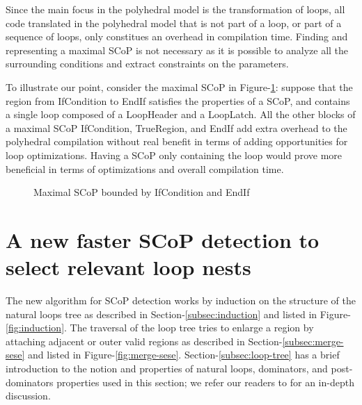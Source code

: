 \documentclass{sigplanconf}
\begin{document}
Since the main focus in the polyhedral model is the transformation of loops, all
code translated in the polyhedral model that is not part of a loop, or part of a
sequence of loops, only constitues an overhead in compilation time.  Finding and
representing a maximal SCoP is not necessary as it is possible to analyze all
the surrounding conditions and extract constraints on the parameters.

To illustrate our point, consider the maximal SCoP in
Figure-\ref{fig:maximality}: suppose that the region from IfCondition to EndIf
satisfies the properties of a SCoP, and contains a single loop composed of a
LoopHeader and a LoopLatch.  All the other blocks of a maximal SCoP
IfCondition, TrueRegion, and EndIf add extra overhead to the polyhedral
compilation without real benefit in terms of adding opportunities for loop
optimizations.  Having a SCoP only containing the loop would prove more
beneficial in terms of optimizations and overall compilation time.

\begin{figure}
\centering
\caption{Maximal SCoP bounded by IfCondition and EndIf}
\label{fig:maximality}
\end{figure}

\section{A new faster SCoP detection to select relevant loop nests}
\label{sec:new-SCoP-detection}
The new algorithm for SCoP detection works by induction on the structure of the
natural loops tree as described in Section-\ref{subsec:induction} and listed in
Figure-\ref{fig:induction}.  The traversal of the loop tree tries to enlarge a
region by attaching adjacent or outer valid regions as described in
Section-\ref{subsec:merge-sese} and listed in Figure-\ref{fig:merge-sese}.
Section-\ref{subsec:loop-tree} has a brief introduction to the notion and
properties of natural loops, dominators, and post-dominators properties used in
this section; we refer our readers to \cite{ramalingam} for an in-depth
discussion.
\end{document}
